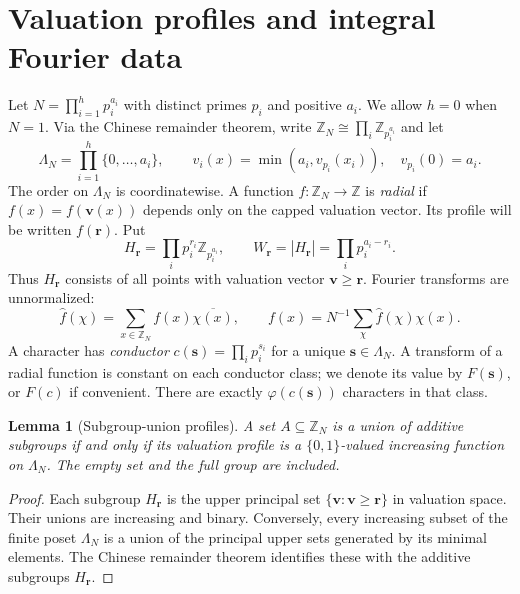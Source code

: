 \documentclass[11pt]{article}
\numberwithin{equation}{section}
\newtheorem{lemma}[theorem]{Lemma}
\theoremstyle{definition}
\theoremstyle{remark}
\newcommand{\s}{\boldsymbol{s}}
\newcommand{\rvec}{\boldsymbol{r}}
\newcommand{\vv}{\boldsymbol{v}}
\begin{document}


\section{Valuation profiles and integral Fourier data}
Let $N=\prod_{i=1}^h p_i^{a_i}$ with distinct primes $p_i$ and positive $a_i$.  We allow $h=0$ when $N=1$.  Via the Chinese remainder theorem, write $\mathbb Z_N\cong\prod_i\mathbb Z_{p_i^{a_i}}$ and let
\[
 \Lambda_N=\prod_{i=1}^h\{0,\ldots,a_i\},\qquad
 v_i(x)=\min(a_i,v_{p_i}(x_i)),\quad v_{p_i}(0)=a_i.
\]
The order on $\Lambda_N$ is coordinatewise.  A function $f:\mathbb Z_N\to\mathbb Z$ is \emph{radial} if $f(x)=f(\vv(x))$ depends only on the capped valuation vector.  Its profile will be written $f(\rvec)$.  Put
\[
 H_{\rvec}=\prod_i p_i^{r_i}\mathbb Z_{p_i^{a_i}},\qquad
 W_{\rvec}=|H_{\rvec}|=\prod_i p_i^{a_i-r_i}.
\]
Thus $H_{\rvec}$ consists of all points with valuation vector $\vv\ge\rvec$.  Fourier transforms are unnormalized:
\[
 \widehat f(\chi)=\sum_{x\in\mathbb Z_N} f(x)\overline{\chi(x)},
 \qquad f(x)=N^{-1}\sum_{\chi}\widehat f(\chi)\chi(x).
\]
A character has \emph{conductor} $c(\s)=\prod_i p_i^{s_i}$ for a unique $\s\in\Lambda_N$.  A transform of a radial function is constant on each conductor class; we denote its value by $F(\s)$, or $F(c)$ if convenient.  There are exactly $\varphi(c(\s))$ characters in that class.

\begin{lemma}[Subgroup-union profiles]\label{ii:lem:upset}
A set $A\subseteq\mathbb Z_N$ is a union of additive subgroups if and only if its valuation profile is a $\{0,1\}$-valued increasing function on $\Lambda_N$.  The empty set and the full group are included.
\end{lemma}
\begin{proof}
Each subgroup $H_{\rvec}$ is the upper principal set $\{\vv:\vv\ge\rvec\}$ in valuation space.  Their unions are increasing and binary.  Conversely, every increasing subset of the finite poset $\Lambda_N$ is a union of the principal upper sets generated by its minimal elements.  The Chinese remainder theorem identifies these with the additive subgroups $H_{\rvec}$.\qedhere
\end{proof}
\end{document}
